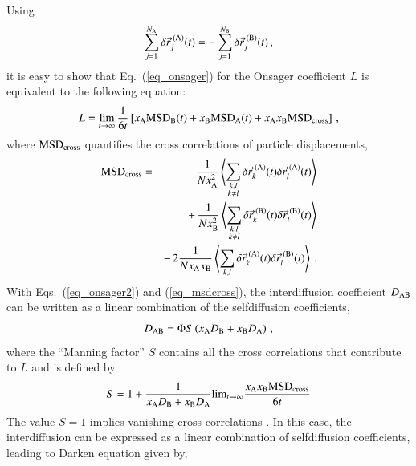    Using
    \begin{equation}
    \sum_{j=1}^{N_{\rm A}} \delta \vec{r}_j^{\rm \; (A)}(t) = 
    - \sum_{j=1}^{N_{\rm B}} \delta \vec{r}_j^{\rm \; (B)}(t) \, ,
    \end{equation}
    it is easy to show that Eq.~(\ref{eq_onsager}) for the Onsager coefficient $L$ is equivalent to the following equation:
    \begin{equation}
    L = \lim_{t\to \infty} \frac{1}{6t} \left[ x_{\rm A} {\rm MSD}_{\rm B}(t)
    + x_{\rm B} {\rm MSD}_{\rm A}(t) + x_{\rm A} x_{\rm B} {\rm MSD}_{\rm cross}  \right] \, ,
    \label{eq_onsager2}
    \end{equation}
    where ${\rm MSD}_{\rm cross}$ quantifies the cross correlations of particle displacements,
    \begin{eqnarray}
    {\rm MSD}_{\rm cross} & = &
    \frac{1}{N x_{\rm A}^2} \left\langle \sum_{\substack{k,l \\ k\neq l}} \delta \vec{r}_k^{\rm \; (A)}(t) \delta \vec{r}_l^{\rm \; (A)}(t) \right\rangle \nonumber \\
    & & + \, \frac{1}{N x_{\rm B}^2} \left\langle \sum_{\substack{k,l \\ k\neq l}} \delta \vec{r}_k^{\rm \; (B)}(t) \delta \vec{r}_l^{\rm \; (B)}(t) \right\rangle \nonumber \\
    & & - \, 2 \frac{1}{N x_{\rm A} x_{\rm B}} \left\langle \sum_{k,l} \delta \vec{r}_k^{\rm \; (A)}(t) \delta \vec{r}_l^{\rm \; (B)}(t) \right\rangle \, .
    \label{eq_msdcross}
    \end{eqnarray}
    With Eqs.~(\ref{eq_onsager2}) and (\ref{eq_msdcross}), the interdiffusion coefficient $D_{\rm AB}$ can be written as a linear combination of the selfdiffusion coefficients,
    \begin{equation}
    D_{\rm AB} = \Phi S \left( x_{\rm A} D_{\rm B} + x_{\rm B} D_{\rm A} \right) \, ,
    \label{eq_dabdarken}
    \end{equation}
    where the ``Manning factor'' \cite{manning1961} $S$ contains all the cross correlations \cite{horbach2007} that contribute to $L$ and is defined by
    \begin{equation}
    S = 1 + \frac{1}{x_{\rm A} D_{\rm B} + x_{\rm B} D_{\rm A}} {\rm lim}_{t \to \infty} \frac{x_{\rm A} x_{\rm B} {\rm MSD}_{\rm cross}}{6t}    
    \end{equation}
    The value $S = 1$ implies vanishing cross correlations \cite{akcasu1997, horbach2007}. In this case, the interdiffusion can be expressed as a linear combination of selfdiffusion coefficients, leading to Darken equation given by,
    
